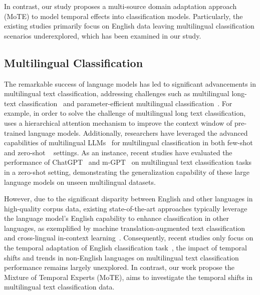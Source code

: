 In contrast, our study proposes a multi-source domain adaptation approach (MoTE) to model temporal effects into classification models. Particularly, the existing studies primarily focus on English data leaving multilingual classification scenarios underexplored, which has been examined in our study.


\subsection{Multilingual Classification}

% 

The remarkable success of language models has led to significant advancements in multilingual text classification, addressing challenges such as multilingual long-text classification~\cite{chalkidis2023chatgpt} and parameter-efficient multilingual classification~\cite{razuvayevskaya2024comparison}.
For example, in order to solve the challenge of multilingual long text classification,~\cite{chalkidis2022lexglue} uses a hierarchical attention mechanism to improve the context window of pre-trained language models. 
Additionally, researchers have leveraged the advanced capabilities of multilingual LLMs~\cite{xue2021mt5,ma2021contributions} for multilingual classification in both few-shot~\cite{wang2020Generalizing} and zero-shot ~\cite{yin2019benchmarking} settings.
As an instance, recent studies have evaluated the performance of ChatGPT~\cite{lai2023chatgpt} and m-GPT~\cite{shliazhko2023mgpt} on multilingual text classification tasks in a zero-shot setting, demonstrating the generalization capability of these large language models on unseen multilingual datasets.



However, due to the significant disparity between English and other languages in high-quality corpus data, existing state-of-the-art approaches typically leverage the language model's English capability to enhance classification in other languages, as exemplified by machine translation-augmented text classification~\cite{king2024using} and cross-lingual in-context learning~\cite{cueva2024adaptive}. 
Consequently, recent studies only focus on the temporal adaptation of English classification task~\cite{agarwal2022temporal,dhingra2022time}, the impact of temporal shifts and trends in non-English languages on multilingual text classification performance remains largely unexplored.
In contrast, our work propose the Mixture of Temporal Experts (MoTE), aims to investigate the temporal shifts in multilingual text classification data.